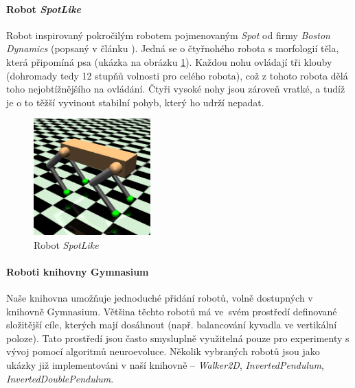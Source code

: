\paragraph{Robot \emph{SpotLike}} \label{imp:robots.Spot}
Robot inspirovaný pokročilým robotem pojmenovaným \emph{Spot} od firmy
\emph{Boston Dynamics} (popsaný v článku \citep{guizzo2019leaps}). Jedná se o
čtyřnohého robota s morfologií těla, která připomíná psa (ukázka na obrázku
\ref{imp:fig:robots.SpotLike}). Každou nohu ovládají tři klouby (dohromady tedy
12 stupňů volnosti pro celého robota), což z tohoto robota dělá toho
nejobtížnějšího na ovládání. Čtyři vysoké nohy jsou zároveň vratké, a tudíž je
o to těžší vyvinout stabilní pohyb, který ho udrží nepadat.

\begin{figure}[!htb]
    \centering
    \includegraphics[width=0.4\textwidth]{../img/crop_SpotLike.jpg}
    \caption{Robot \emph{SpotLike}}
    \label{imp:fig:robots.SpotLike}
\end{figure}

\paragraph{}

\paragraph{Roboti knihovny Gymnasium}
Naše knihovna umožňuje jednoduché přidání robotů, volně dostupných v knihovně
Gymnasium. Většina těchto robotů má ve~svém prostředí definované složitější
cíle, kterých mají dosáhnout (např. balancování kyvadla ve vertikální poloze).
Tato prostředí jsou často smysluplně využitelná pouze pro experimenty s vývoj
pomocí algoritmů neuroevoluce. Několik vybraných robotů jsou jako ukázky již
implementováni v naší knihovně -- \emph{Walker2D}, \emph{InvertedPendulum},
\emph{InvertedDoublePendulum}.

